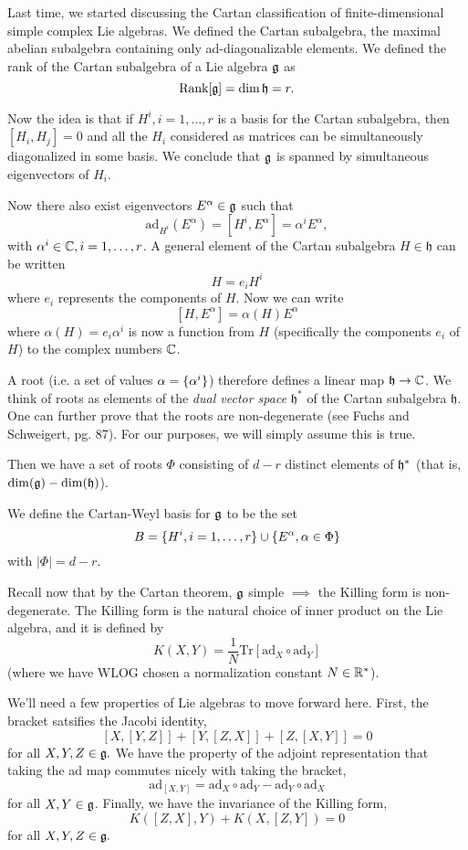 Last time, we started discussing the Cartan classification of finite-dimensional simple complex Lie algebras. We defined the Cartan subalgebra, the maximal abelian subalgebra containing only ad-diagonalizable elements. We defined the rank of the Cartan subalgebra of a Lie algebra $\mathfrak{g}$ as
$$\text{Rank}[\mathfrak{g}]=\dim \mathfrak{h} = r.$$

Now the idea is that if $H^i,i=1,\ldots,r$ is a basis for the Cartan subalgebra, then $[H_i,H_j]=0$ and all the $H_i$ considered as matrices can be simultaneously diagonalized in some basis. We conclude that $\mathfrak{g}$ is spanned by simultaneous eigenvectors of $H_i$.

Now there also exist eigenvectors $E^\alpha \in \mathfrak{g}$ such that
$$\text{ad}_{H^i}(E^\alpha)=[H^i, E^\alpha]=\alpha^i E^\alpha,$$
with $\alpha^i\in \mathbb{C},i=1,\ldots,r$. A general element of the Cartan subalgebra $H\in \mathfrak{h}$ can be written
$$H=e_i H^i$$
where $e_i$ represents the components of $H$. Now we can write
$$[H,E^\alpha]=\alpha(H)E^\alpha$$
where $\alpha(H)=e_i \alpha^i$ is now a function from $H$ (specifically the components $e_i$ of $H$) to the complex numbers $\mathbb{C}$.

A root (i.e. a set of values $\alpha=\{\alpha^i\}$) therefore defines a linear map $\mathfrak{h}\to \mathbb{C}$. We think of roots as elements of the \emph{dual vector space} $\mathfrak{h}^*$ of the Cartan subalgebra $\mathfrak{h}$. One can further prove that the roots are non-degenerate (see Fuchs and Schweigert, pg. 87). For our purposes, we will simply assume this is true.

Then we have a set of roots $\Phi$ consisting of $d-r$ distinct elements of $\mathfrak{h}^*$ (that is, $\dim(\mathfrak{g})-\dim(\mathfrak{h})$). 
\begin{defn}
We define the Cartan-Weyl basis for $\mathfrak{g}$ to be the set
$$B=\{H^i,i=1,\ldots,r\}\cup \{E^\alpha, \alpha \in \Phi\}$$
with $|\Phi|=d-r$.
\end{defn}

Recall now that by the Cartan theorem, $\mathfrak{g}$ simple $\implies$ the Killing form is non-degenerate. The Killing form is the natural choice of inner product on the Lie algebra, and it is defined by
$$K(X,Y)=\frac{1}{N}\text{Tr}[\text{ad}_X \circ \text{ad}_Y]$$
(where we have WLOG chosen a normalization constant $N\in\mathbb{R}^*$).

We'll need a few properties of Lie algebras to move forward here. First, the bracket satsifies the Jacobi identity,
\begin{equation}\label{jacobi}
    [X,[Y,Z]]+[Y,[Z,X]]+[Z,[X,Y]]=0
\end{equation}
for all $X,Y,Z\in \mathfrak{g}.$
We have the property of the adjoint representation that taking the ad map commutes nicely with taking the bracket,
\begin{equation}
    \text{ad}_{[X,Y]}=\text{ad}_X \circ \text{ad}_Y-\text{ad}_Y \circ \text{ad}_X
\end{equation}
for all $X,Y\in \mathfrak{g}$.
Finally, we have the invariance of the Killing form,
\begin{equation}\label{killinginvariance}
    K([Z,X],Y)+K(X,[Z,Y])=0
\end{equation}
for all $X,Y,Z\in \mathfrak{g}.$

